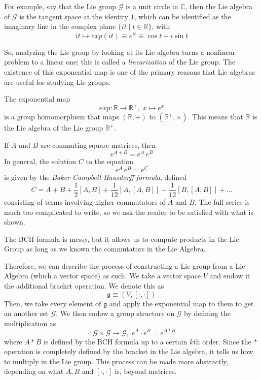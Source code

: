 \documentclass{article}
\begin{document}
    For example, say that the Lie group $\mathcal{G}$ is a unit circle in $\mathbb{C}$, then the Lie algebra of $\mathcal{G}$ is the tangent space at the identity $1$, which can be identified as the imaginary line in the complex plane $\{i t \; | \; t \in \mathbb{R}\}$, with 
    \[i t \mapsto exp(it) \equiv e^{it} \equiv \cos{t} + i \sin{t}\]
    \begin{center}
    \end{center}
    So, analyzing the Lie group by looking at its Lie algebra turns a nonlinear problem to a linear one; this is called a \textit{linearization} of the Lie group. The existence of this exponential map is one of the primary reasons that Lie algebras are useful for studying Lie groups. 
    \begin{example}
    The exponential map 
    \[exp: \mathbb{R} \longrightarrow \mathbb{R}^+, \; x \mapsto e^x\]
    is a group homomorphism that maps $(\mathbb{R}, +)$ to $(\mathbb{R}^+, \times)$. This means that $\mathbb{R}$ is the Lie algebra of the Lie group $\mathbb{R}^+$. 
    \end{example}

    \begin{theorem}
    If $A$ and $B$ are commuting square matrices, then 
    \[e^{A + B} = e^A \, e^B\]
    In general, the solution $C$ to the equation
    \[e^{A} \, e^B = e^C\]
    is given by the \textit{Baker-Campbell-Hausdorff formula}, defined
    \[C = A + B + \frac{1}{2}[A,B] + \frac{1}{12} [A,[A,B]] - \frac{1}{12} [B,[A,B]] + ...\]
    consisting of terms involving higher commutators of $A$ and $B$. The full series is much too complicated to write, so we ask the reader to be satisfied with what is shown. 
    \end{theorem}
    The BCH formula is messy, but it allows us to compute products in the Lie Group as long as we known the commutators in the Lie Algebra. 

    Therefore, we can describe the process of constructing a Lie group from a Lie Algebra (which a vector space) as such. We take a vector space $V$ and endow it the additional bracket operation. We denote this as
    \[\mathfrak{g} \equiv (V, [\cdot, \cdot])\]
    Then, we take every element of $\mathfrak{g}$ and apply the exponential map to them to get an another set $\mathcal{G}$. We then endow a group structure on $\mathcal{G}$ by defining the multiplication as 
    \[\cdot: \mathcal{G} \times \mathcal{G} \longrightarrow \mathcal{G}, \; e^A \cdot e^B = e^{A * B}\]
    where $A*B$ is defined by the BCH formula up to a certain $k$th order. Since the $*$ operation is completely defined by the bracket in the Lie algebra, it tells us how to multiply in the Lie group. This process can be made more abstractly, depending on what $A, B$ and $[\cdot,\cdot]$ is, beyond matrices. 
\end{document}

